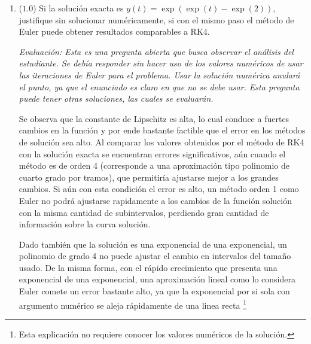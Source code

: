 \documentclass[12pt]{article}
\begin{document}
\begin{enumerate}[leftmargin=*,widest=9]
\begin{enumerate}[label=\alph*]
   \item (\(1.0\)) Si la solución exacta es \( y(t) = \exp(\exp(t)-\exp(2))\), justifique sin solucionar numéricamente, si con el mismo paso el método de Euler puede obtener resultados comparables a RK4.

   \textit{Evaluación: Esta es una pregunta abierta que busca observar el análisis del estudiante. Se debía responder sin hacer uso de los valores numéricos de usar las iteraciones de Euler para el problema. Usar la solución numérica anulará el punto, ya que el enunciado es claro en que no se debe usar. Esta pregunta puede tener otras soluciones, las cuales se evaluarán.}

   Se observa que la constante de Lipschitz es alta, lo cual conduce a fuertes cambios en la función y por ende bastante factible que el error en los métodos de solución sea alto. Al comparar los valores obtenidos por el método de RK4 con la solución exacta se encuentran errores significativos, aún cuando el método es de orden 4 (corresponde a una aproximación tipo polinomio de cuarto grado por tramos), que permitiría ajustarse mejor a los grandes cambios. Si aún con esta condición el error es alto, un método orden 1 como Euler no podrá ajustarse rapidamente a los cambios de la función solución con la misma cantidad de subintervalos, perdiendo gran cantidad de información sobre la curva solución.

   Dado también que la solución es una exponencial de una exponencial, un polinomio de grado 4 no puede ajustar el cambio en intervalos del tamaño usado. De la misma forma, con el rápido crecimiento que presenta una exponencial de una exponencial, una aproximación lineal como lo considera Euler comete un error bastante alto, ya que la exponencial por si sola con argumento numérico se aleja rápidamente de una linea recta \footnote{Esta explicación no requiere conocer los valores numéricos de la solución.}

    \end{enumerate}

  \end{enumerate}
\end{document}
